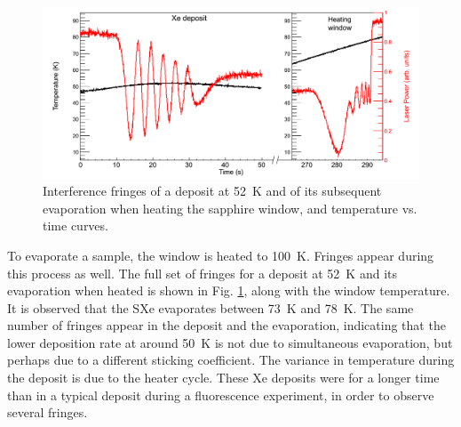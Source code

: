 \begin{figure} %
        \centering
                \includegraphics[width=.9\textwidth]{figures/fringes_dep_and_melt.png}
                \caption{Interference fringes of a deposit at 52~K and of its subsequent evaporation when heating the sapphire window, and temperature vs. time curves.}
\label{fig:fringes_melt_withDep}
\end{figure}

To evaporate a sample, the window is heated to 100~K.  Fringes appear during this process as well.  The full set of fringes for a deposit at 52~K and its evaporation when heated is shown in Fig. \ref{fig:fringes_melt_withDep}, along with the window temperature.  It is observed that the SXe evaporates between 73~K and 78~K.  The same number of fringes appear in the deposit and the evaporation, indicating that the lower deposition rate at around 50~K is not due to simultaneous evaporation, but perhaps due to a different sticking coefficient.  The variance in temperature during the deposit is due to the heater cycle.  These Xe deposits were for a longer time than in a typical deposit during a fluorescence experiment, in order to observe several fringes.



